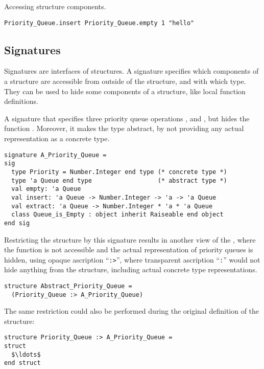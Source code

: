 \example Accessing structure components.
\begin{lstlisting}
Priority_Queue.insert Priority_Queue.empty 1 "hello"
\end{lstlisting}






\subsection{Signatures}

Signatures are interfaces of structures. A signature specifies which components of a structure are accessible from outside of the structure, and with which type. They can be used to hide some components of a structure, like local function definitions. 

\example A signature that specifies three priority queue operations ,  and , but hides the function . Moreover, it makes the  type abstract, by not providing any actual representation as a concrete type. 
\begin{lstlisting}
signature A_Priority_Queue =
sig
  type Priority = Number.Integer end type (* concrete type *)
  type 'a Queue end type                  (* abstract type *)
  val empty: 'a Queue
  val insert: 'a Queue -> Number.Integer -> 'a -> 'a Queue
  val extract: 'a Queue -> Number.Integer * 'a * 'a Queue
  class Queue_is_Empty : object inherit Raiseable end object
end sig
\end{lstlisting}
Restricting the  structure by this signature results in another view of the , where the  function is not accessible and the actual representation of priority queues is hidden, using opaque ascription ``\lstinline!:>!'', where transparent ascription ``\lstinline!:!'' would not hide anything from the structure, including actual concrete type representations. 
\begin{lstlisting}
structure Abstract_Priority_Queue = 
  (Priority_Queue :> A_Priority_Queue)
\end{lstlisting}
The same restriction could also be performed during the original definition of the structure:
\begin{lstlisting}
structure Priority_Queue :> A_Priority_Queue =
struct 
  $\ldots$
end struct
\end{lstlisting}





